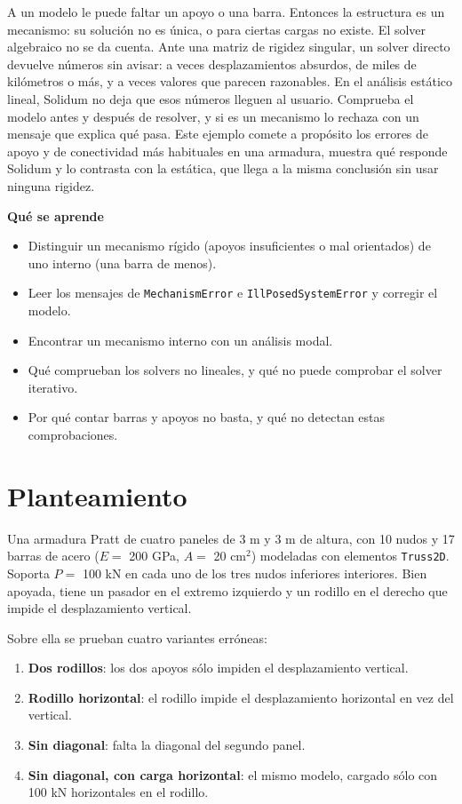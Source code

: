 \documentclass[11pt,oneside]{report}
\begin{document}
A un modelo le puede faltar un apoyo o una barra. Entonces la estructura es un mecanismo: su solución no es única, o para ciertas cargas no existe. El solver algebraico no se da cuenta. Ante una matriz de rigidez singular, un solver directo devuelve números sin avisar: a veces desplazamientos absurdos, de miles de kilómetros o más, y a veces valores que parecen razonables. En el análisis estático lineal, Solidum no deja que esos números lleguen al usuario. Comprueba el modelo antes y después de resolver, y si es un mecanismo lo rechaza con un mensaje que explica qué pasa. Este ejemplo comete a propósito los errores de apoyo y de conectividad más habituales en una armadura, muestra qué responde Solidum y lo contrasta con la estática, que llega a la misma conclusión sin usar ninguna rigidez.

\textbf{Qué se aprende}

\begin{itemize}
  \item Distinguir un mecanismo rígido (apoyos insuficientes o mal orientados) de uno interno (una barra de menos).
  \item Leer los mensajes de \texttt{MechanismError} e \texttt{IllPosedSystemError} y corregir el modelo.
  \item Encontrar un mecanismo interno con un análisis modal.
  \item Qué comprueban los solvers no lineales, y qué no puede comprobar el solver iterativo.
  \item Por qué contar barras y apoyos no basta, y qué no detectan estas comprobaciones.
\end{itemize}

\section{Planteamiento}

Una armadura Pratt de cuatro paneles de 3 m y 3 m de altura, con 10 nudos y 17 barras de acero ($E =$ 200 GPa, $A =$ 20 cm\ensuremath{^{2}}) modeladas con elementos \texttt{Truss2D}. Soporta $P =$ 100 kN en cada uno de los tres nudos inferiores interiores. Bien apoyada, tiene un pasador en el extremo izquierdo y un rodillo en el derecho que impide el desplazamiento vertical.

Sobre ella se prueban cuatro variantes erróneas:

\begin{enumerate}
  \item \textbf{Dos rodillos}: los dos apoyos sólo impiden el desplazamiento vertical.
  \item \textbf{Rodillo horizontal}: el rodillo impide el desplazamiento horizontal en vez del vertical.
  \item \textbf{Sin diagonal}: falta la diagonal del segundo panel.
  \item \textbf{Sin diagonal, con carga horizontal}: el mismo modelo, cargado sólo con 100 kN horizontales en el rodillo.
\end{enumerate}
\end{document}
